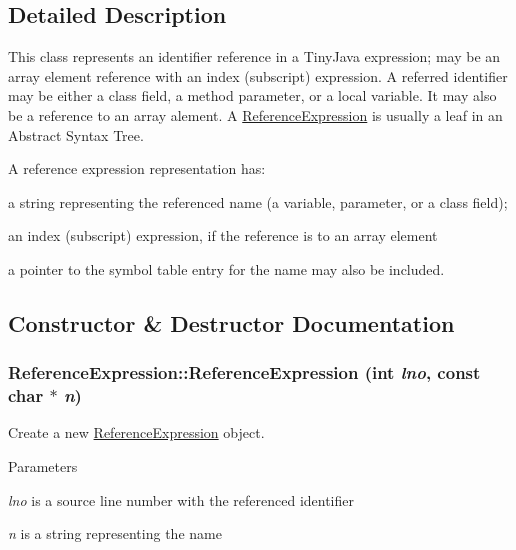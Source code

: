 \subsection{Detailed Description}
This class represents an identifier reference in a TinyJava expression; may be an array element reference with an index (subscript) expression. A referred identifier may be either a class field, a method parameter, or a local variable. It may also be a reference to an array alement. A \hyperlink{classReferenceExpression}{ReferenceExpression} is usually a leaf in an Abstract Syntax Tree.

A reference expression representation has:
\begin{DoxyItemize}
\item a string representing the referenced name (a variable, parameter, or a class field);
\item an index (subscript) expression, if the reference is to an array element
\item a pointer to the symbol table entry for the name may also be included. 
\end{DoxyItemize}

\subsection{Constructor \& Destructor Documentation}
\hypertarget{classReferenceExpression_a7f614ef621f7336070a5a0f495475cce}{
\subsubsection[{ReferenceExpression}]{\setlength{\rightskip}{0pt plus 5cm}ReferenceExpression::ReferenceExpression (int {\em lno}, \/  const char $\ast$ {\em n})}}
\label{classReferenceExpression_a7f614ef621f7336070a5a0f495475cce}
Create a new \hyperlink{classReferenceExpression}{ReferenceExpression} object.


\begin{DoxyParams}{Parameters}
\item[{\em lno}]is a source line number with the referenced identifier \item[{\em n}]is a string representing the name \end{DoxyParams}

